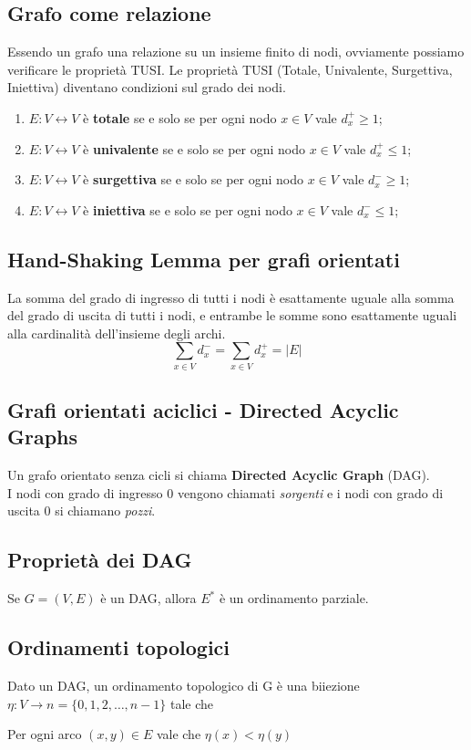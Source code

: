 \documentclass{article}
\begin{document}
\subsection*{Grafo come relazione}
Essendo un grafo una relazione su un insieme finito di nodi, ovviamente possiamo verificare le proprietà TUSI.
Le proprietà TUSI (Totale, Univalente, Surgettiva, Iniettiva) diventano condizioni sul grado dei nodi.
\begin{enumerate}
    \item \(E: V \leftrightarrow V\) è \textbf{totale} se e solo se per ogni nodo \(x \in V\) vale \(d_x^+ \geq 1\);
    \item \(E: V \leftrightarrow V\) è \textbf{univalente} se e solo se per ogni nodo \(x \in V\) vale \(d_x^+ \leq 1\);
    \item \(E: V \leftrightarrow V\) è \textbf{surgettiva} se e solo se per ogni nodo \(x \in V\) vale \(d_x^- \geq 1\);
    \item \(E: V \leftrightarrow V\) è \textbf{iniettiva} se e solo se per ogni nodo \(x \in V\) vale \(d_x^- \leq 1\);
\end{enumerate}
\subsection*{Hand-Shaking Lemma per grafi orientati}
La somma del grado di ingresso di tutti i nodi è esattamente uguale alla somma del grado di uscita di tutti i nodi, e entrambe le somme sono esattamente uguali alla cardinalità dell'insieme degli archi.
\[\sum_{x \in V} d_x^- = \sum_{x \in V} d_x^+ = \lvert E \rvert\]

\subsection{Grafi orientati aciclici - Directed Acyclic Graphs}
Un grafo orientato senza cicli si chiama \textbf{Directed Acyclic Graph} (DAG). \\
I nodi con grado di ingresso 0 vengono chiamati \emph{sorgenti} e i nodi con grado di uscita 0 si chiamano \emph{pozzi}.
\subsection*{Proprietà dei DAG}
Se \(G = (V,E)\) è un DAG, allora \(E^*\) è un ordinamento parziale.
\subsection*{Ordinamenti topologici}
Dato un DAG, un ordinamento topologico di G è una biiezione \(\eta: V \rightarrow n = \{0,1,2,\ldots,n-1\}\) tale che
\begin{center}
    Per ogni arco \((x,y) \in E\) vale che \(\eta(x) < \eta(y)\)
\end{center}
\end{document}
